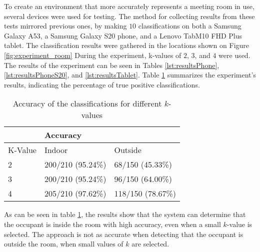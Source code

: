 To create an environment that more accurately represents a meeting room in use, several devices were used for testing. 
The method for collecting results from these tests mirrored previous ones, by making $10$ classifications on both a Samsung Galaxy A53, a Samsung Galaxy S20 phone, and a Lenovo TabM10 FHD Plus tablet. 
The classification results were gathered in the locations shown on Figure \ref{fig:experiment_room}
During the experiment, k-values of $2$, $3$, and $4$ were used.  
The results of the experiment can be seen in Tables \ref{lst:resultsPhone}, \ref{lst:resultsPhoneS20}, and  \ref{lst:resultsTablet}.
Table \ref{lst:resultsPhone_precision} summarizes the experiment's results, indicating the percentage of true positive classifications. 

\begin{table}[H]
    \centering
    \begin{tabular}{|l|ll|}
    \hline
            & \multicolumn{2}{l|}{Accuracy}                      \\ \hline
    K-Value & \multicolumn{1}{l|}{Indoor}          & Outside      \\ \hline
    2       & \multicolumn{1}{l|}{200/210 (95.24\%)} & 68/150 (45.33\%) \\ \hline
    3       & \multicolumn{1}{l|}{200/210 (95.24\%)} & 96/150 (64.00\%) \\ \hline
    4       & \multicolumn{1}{l|}{205/210 (97.62\%)} & 118/150 (78.67\%) \\ \hline   
    \end{tabular}
    \caption{Accuracy of the classifications for different $k$-values}
    \label{lst:resultsPhone_precision}
\end{table}
As can be seen in table \ref{lst:resultsPhone_precision}, the results show that the system can determine that the occupant is inside the room with high accuracy, even when a small $k$-value is selected. The approach is not as accurate when detecting that the occupant is outside the room, when small values of $k$ are selected.  
